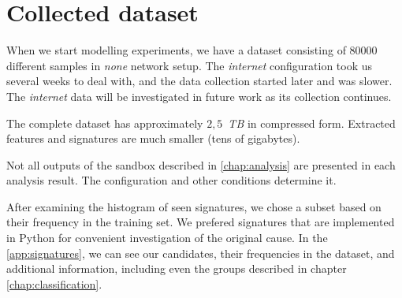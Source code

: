 \section{Collected dataset}
When we start modelling experiments, we have a dataset consisting of $80000$ different samples in \emph{none} network setup. The \emph{internet} configuration took us several weeks to deal with, and the data collection started later and was slower. The \emph{internet} data will be investigated in future work as its collection continues. 

The complete dataset has approximately $2,5$~\emph{TB} in compressed form. Extracted features and signatures are much smaller (tens of gigabytes). 

Not all outputs of the sandbox described in \ref{chap:analysis} are presented in each analysis result. The configuration and other conditions determine it.

After examining the histogram of seen signatures, we chose a subset based on their frequency in the training set. We prefered signatures that are implemented in Python for convenient investigation of the original cause. In the \ref{app:signatures}, we can see our candidates, their frequencies in the dataset, and additional information, including even the groups described in chapter \ref{chap:classification}.






